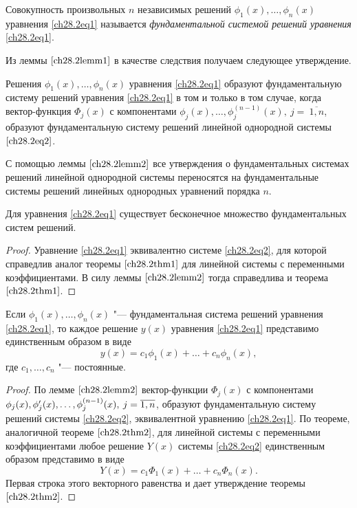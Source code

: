 \begin{defn}
Совокупность произвольных $n$ независимых решений $\phi_1(x), \ldots, \phi_n(x)$ уравнения \eqref{ch28.2eq1} называется \textit{фундаментальной системой решений уравнения} \eqref{ch28.2eq1}.
\end{defn}

Из леммы $\ref{ch28.2lemm1}$ в качестве следствия получаем следующее утверждение.

\begin{lemm} \label{ch28.2lemm2}
Решения $\phi_1(x), \ldots, \phi_n(x)$ уравнения \eqref{ch28.2eq1} образуют фундаментальную систему решений уравнения \eqref{ch28.2eq1} в том и только в том случае, когда вектор-функция $\Phi_j(x)$ с компонентами $\phi_j(x), \ldots, \phi^{(n - 1)}_j(x),\ j =\ \overline{1,n}$, образуют фундаментальную систему решений линейной однородной системы $\eqref{ch28.2eq2}$.
\end{lemm}

С помощью леммы $\ref{ch28.2lemm2}$ все утверждения о фундаментальных системах решений линейной однородной системы переносятся на фундаментальные системы решений линейных однородных уравнений порядка $n$.

\begin{thm} \label{ch28.2thm1}
Для уравнения \eqref{ch28.2eq1} существует бесконечное множество фундаментальных систем решений.
\end{thm}

\begin{proof}
Уравнение \eqref{ch28.2eq1} эквивалентно системе \eqref{ch28.2eq2}, для которой справедлив аналог теоремы $\ref{ch28.2thm1}$ для линейной системы с переменными коэффициентами. В силу леммы $\ref{ch28.2lemm2}$ тогда справедлива и теорема $\ref{ch28.2thm1}$.
\end{proof}

\begin{thm} \label{ch28.2thm2}
Если $\phi_1(x), \ldots, \phi_n(x)$ "--- фундаментальная система решений уравнения \eqref{ch28.2eq1}, то каждое решение $y(x)$ уравнения \eqref{ch28.2eq1} представимо единственным образом в виде
$$
y(x) = c_1\phi_1(x) + \ldots + c_n\phi_n(x),
$$
где $c_1, \ldots, c_n$ "--- постоянные.
\end{thm}

\begin{proof}
По лемме $\ref{ch28.2lemm2}$ вектор-функции $\Phi_j(x)$ с компонентами $\phi_j(x),\\ \phi'_j(x), \ldots, \phi^{(n - 1)}_j(x), \: j = \overline{1,n}$, образуют фундаментальную систему решений системы \eqref{ch28.2eq2}, эквивалентной уравнению \eqref{ch28.2eq1}. По теореме, аналогичной теореме $\ref{ch28.2thm2}$, для линейной системы с переменными коэффициентами любое решение $Y(x)$ системы \eqref{ch28.2eq2} единственным образом представимо в виде
$$
Y(x) = c_1 \Phi_1(x) + \ldots + c_n \Phi_n(x).
$$
Первая строка этого векторного равенства и дает утверждение теоремы~$\ref{ch28.2thm2}$.
\end{proof}

